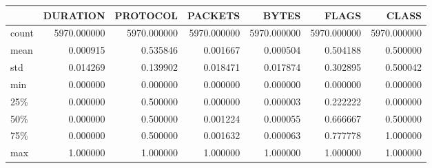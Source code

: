 \begin{tabular}{lrrrrrr}
\toprule
{} &     DURATION &     PROTOCOL &      PACKETS &        BYTES &        FLAGS &        CLASS \\
\midrule
count &  5970.000000 &  5970.000000 &  5970.000000 &  5970.000000 &  5970.000000 &  5970.000000 \\
mean  &     0.000915 &     0.535846 &     0.001667 &     0.000504 &     0.504188 &     0.500000 \\
std   &     0.014269 &     0.139902 &     0.018471 &     0.017874 &     0.302895 &     0.500042 \\
min   &     0.000000 &     0.000000 &     0.000000 &     0.000000 &     0.000000 &     0.000000 \\
25\%   &     0.000000 &     0.500000 &     0.000000 &     0.000003 &     0.222222 &     0.000000 \\
50\%   &     0.000000 &     0.500000 &     0.001224 &     0.000055 &     0.666667 &     0.500000 \\
75\%   &     0.000000 &     0.500000 &     0.001632 &     0.000063 &     0.777778 &     1.000000 \\
max   &     1.000000 &     1.000000 &     1.000000 &     1.000000 &     1.000000 &     1.000000 \\
\bottomrule
\end{tabular}
